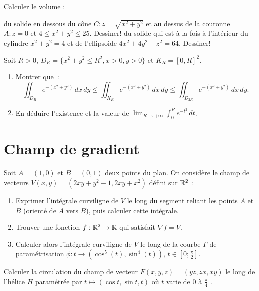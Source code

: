 \documentclass{tp_um}
\begin{document}
\exo{}Calculer le volume :
\begin{modenumerate}
	\item du solide en dessous du c\^one $C : z=\sqrt{ x^2+y^2}$ et au dessus de la couronne $A: z=0$ et $ 4\leq x^2+y^2\leq 25$. Dessiner!
            \moditem{*} du solide qui est \`a la fois \`a l'int\'erieur du cylindre $x^2+y^2=4$ et de l'ellipsoide $4x^2+4y^2+z^2=64$. Dessiner!
\end{modenumerate}

\bigskip



 Soit $R>0$, $D_R=\{x^2+y^2\le R^2, x>0, y>0\}$ et $K_R=[0,R]^2$.
\begin{enumerate}
    \item Montrer que~: 
        \[\iint_{D_R} e^{-(x^2+y^2)}\, dx\, dy \le \iint_{K_R} e^{-(x^2+y^2)}\, dx\, dy \le
        \iint_{D_{2R}} e^{-(x^2+y^2)}\, dx\, dy.\]

    \item En d\'eduire l'existence et la valeur de $\displaystyle \lim_{R\rightarrow +\infty} \int_0^R e^{-t^2}\, dt$.
\end{enumerate}


\section{Champ de gradient}

\exo{}
Soit $A = (1,0)$ et $B = (0,1)$ deux points du plan. On considère le champ de vecteurs $V(x,y) = (2xy+y^2-1 , 2xy + x^2) $ défini sur $\mathbb{R}^2$ :
\begin{enumerate}
	\item Exprimer l'intégrale curviligne de $V$ le long du segment reliant les points $A$ et  $B$ (orienté de $A$ vers $B$), puis calculer cette intégrale.
	\item Trouver une  fonction $f:\mathbb{R}^2 \to \mathbb{R}$ qui satisfait $ \nabla f = V$.
	\item Calculer alors l'intégrale curviligne de $V$ le long de la courbe $\Gamma$ de paramétrisation $\phi :t \to (\cos^5(t),\sin^4(t))$, $t \in [0; \frac{\pi}{2}]$.
\end{enumerate}

\bigskip

\exo{ }Calculer la circulation du champ de vecteur  $F(x, y, z) = (yz, zx, xy)$ le long de l'hélice $H$ paramétrée par $t \mapsto (\cos t, \sin t, t)$ où $t$ varie de $0$ à $\frac \pi 4$ . 
\end{document}
